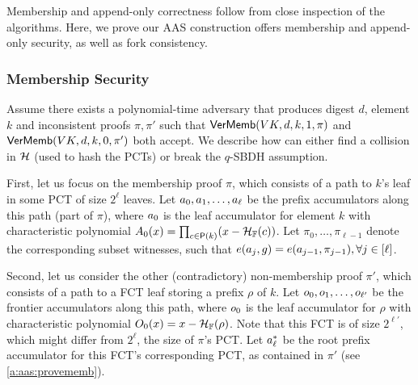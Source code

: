 Membership and append-only correctness follow from close inspection of the algorithms. 
Here, we prove our AAS construction offers membership and append-only security, as well as fork consistency.

\subsubsection{Membership Security}
\label{s:aas:from-bilinear-acc:proofs:membership-security}
Assume there exists a polynomial-time adversary \Adv that produces digest $d$, element $k$ and inconsistent proofs $\pi,\pi'$ such that $\mathsf{VerMemb}(VK,d,k,1,\pi)$ and $\mathsf{VerMemb}(VK,d,k,0,\pi')$ both accept. 
We describe how \Adv can either find a collision in $\mathcal{H}$ (used to hash the PCTs) or break the $q$-SBDH assumption.

\begingroup
\renewcommand{\myblue}[1]{\textcolor{black}{#1}}
\renewcommand{\mathbf}[1]{#1}
\renewcommand{\boldsymbol}[1]{#1}

First, let us focus on the membership proof $\pi$, which consists of a path to $k$'s leaf in some PCT of size $2^\ell$ leaves.
Let $\acc_0,\acc_1,\dots,\acc_{\ell}$ be the prefix accumulators along this path (part of $\pi$), where $\acc_0$ is the leaf accumulator for element $k$ with characteristic polynomial $A_0(x) = \prod_{c \in \mathsf{P}(k)}(x-\mathcal{H}_{\mathbb{F}}(c))$.
Let $\pi_0, \dots, \pi_{\ell-1}$ denote the corresponding subset witnesses, such that $e(\acc_j, g) = e(\acc_{j-1}, \pi_{j-1}), \forall j \in [\ell]$.

Second, let us consider the other (contradictory) non-membership proof $\pi'$, which consists of a path to a FCT leaf storing a prefix $\rho$ of $k$.
Let $o_0, o_1,\dots,o_{\ell'}$ be the frontier accumulators along this path, where $o_0$ is the leaf accumulator for $\rho$ with characteristic polynomial $O_0(x) = x-\mathcal{H}_{\mathbb{F}}(\rho)$.
Note that this FCT is of size $2^{\ell'}$, which might differ from $2^\ell$, the size of $\pi$'s PCT.
Let $\acc^*_\ell$ be the root prefix accumulator for this FCT's corresponding PCT, as contained in $\pi'$ (see \cref{a:aas:provememb}).

